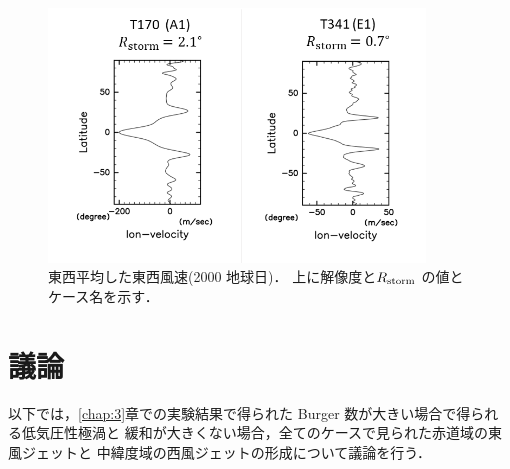 \documentclass[a4j,12pt,openbib,oneside]{jreport}
\begin{document}
\begin{figure}[ht]
  \begin{center}
    \includegraphics[clip,width=10cm]{./fig/result/case4/case4_vellon.png}
    \caption{
      \footnotesize{東西平均した東西風速(2000 地球日)．
上に解像度と$R_{\rm{storm}}$ の値とケース名を示す．
      }
    }
    \label{fig:case4_vellon}
  \end{center}
\end{figure}
%

%
%
\def\chap4{議論}
\chapter{\chap4}
\label{chap:4}
\markright{4 \chap4}
%
以下では，\ref{chap:3}章での実験結果で得られた
Burger 数が大きい場合で得られる低気圧性極渦と
緩和が大きくない場合，全てのケースで見られた赤道域の東風ジェットと
中緯度域の西風ジェットの形成について議論を行う．
\end{document}

